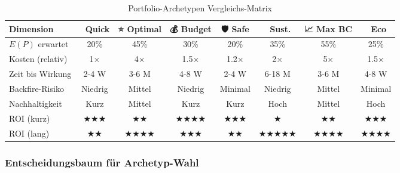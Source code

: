 \begin{table}[htbp]
\centering
\caption{Portfolio-Archetypen Vergleichs-Matrix}
\label{tab:20-archetype-comparison}
\renewcommand{\arraystretch}{1.3}
\footnotesize
\begin{tabular}{@{}lccccccc@{}}
\toprule
\textbf{Dimension} & \textbf{🚀 Quick} & \textbf{⭐ Optimal} & \textbf{💰 Budget} & \textbf{🛡️ Safe} & \textbf{🔄 Sust.} & \textbf{📈 Max BC} & \textbf{🌱 Eco} \\
\midrule
$E(P)$ erwartet & 20\% & 45\% & 30\% & 20\% & 35\% & 55\% & 25\% \\
Kosten (relativ) & 1× & 4× & 1.5× & 1.2× & 2× & 5× & 1.5× \\
Zeit bis Wirkung & 2-4 W & 3-6 M & 4-8 W & 2-4 W & 6-18 M & 3-6 M & 4-8 W \\
Backfire-Risiko & Niedrig & Mittel & Niedrig & Minimal & Niedrig & Mittel & Minimal \\
Nachhaltigkeit & Kurz & Mittel & Kurz & Kurz & Hoch & Mittel & Hoch \\
ROI (kurz) & ★★★ & ★★ & ★★★★ & ★★★ & ★ & ★★ & ★★★ \\
ROI (lang) & ★★ & ★★★★ & ★★★ & ★★ & ★★★★★ & ★★★★ & ★★★★ \\
\bottomrule
\end{tabular}
\end{table}

\subsubsection{Entscheidungsbaum für Archetyp-Wahl}

